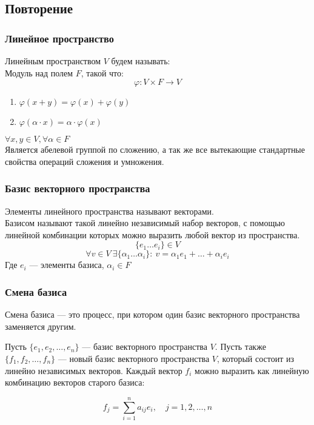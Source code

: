 \subsection{Повторение}
\subsubsection{Линейное пространство}
Линейным пространством $V$ будем называть:\\
Модуль над полем $F$, такой что:
\[
\varphi : V \times F \to V
\]
\begin{enumerate}
    \item \( \varphi(x+y) = \varphi(x) + \varphi(y) \)
    \item \( \varphi(\alpha \cdot x) = \alpha \cdot \varphi(x) \)
\end{enumerate}
\( \forall x,y \in V, \forall \alpha \in F \)\\
Является абелевой группой по сложению, а так же все вытекающие
стандартные свойства операций сложения и умножения.

\subsubsection*{Базис векторного пространства}
Элементы линейного пространства называют векторами.\\
Базисом называют такой линейно независимый набор векторов, 
с помощью линейной комбинации которых можно выразить любой вектор
из пространства.\\
\[
    \{e_1 \dots e_i\} \in V 
\]
\[
    \forall v \in V\  \exists \{\alpha_1 \dots \alpha_i\}: \ v = \alpha_1 e_1 + \dots + \alpha_i e_i
\]
Где $e_i$ --- элементы базиса, $\alpha_i \in F$

\subsubsection*{Смена базиса}

Смена базиса — это процесс, при котором один базис векторного пространства заменяется другим.

Пусть $\{e_1, e_2, \ldots, e_n\}$ — базис векторного пространства $V$. Пусть также $\{f_1, f_2, \ldots, f_n\}$ — новый базис векторного пространства $V$, который состоит из линейно независимых векторов. Каждый вектор $f_i$ можно выразить как линейную комбинацию векторов старого базиса:

\[
f_j = \sum_{i=1}^{n} a_{ij} e_i, \quad j = 1, 2, \ldots, n
\]


